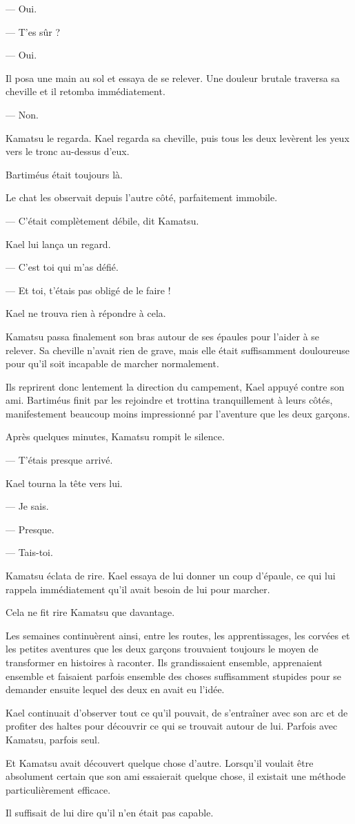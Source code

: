 — Oui.

— T'es sûr ?

— Oui.

Il posa une main au sol et essaya de se relever. Une douleur brutale traversa
sa cheville et il retomba immédiatement.

— Non.

Kamatsu le regarda. Kael regarda sa cheville, puis tous les deux levèrent les
yeux vers le tronc au-dessus d'eux.

Bartiméus était toujours là.

Le chat les observait depuis l'autre côté, parfaitement immobile.

— C'était complètement débile, dit Kamatsu.

Kael lui lança un regard.

— C'est toi qui m'as défié.

— Et toi, t'étais pas obligé de le faire !

Kael ne trouva rien à répondre à cela.

Kamatsu passa finalement son bras autour de ses épaules pour l'aider à se
relever. Sa cheville n'avait rien de grave, mais elle était suffisamment
douloureuse pour qu'il soit incapable de marcher normalement.

Ils reprirent donc lentement la direction du campement, Kael appuyé contre son
ami. Bartiméus finit par les rejoindre et trottina tranquillement à leurs
côtés, manifestement beaucoup moins impressionné par l'aventure que les deux
garçons.

Après quelques minutes, Kamatsu rompit le silence.

— T'étais presque arrivé.

Kael tourna la tête vers lui.

— Je sais.

— Presque.

— Tais-toi.

Kamatsu éclata de rire. Kael essaya de lui donner un coup d'épaule, ce qui lui
rappela immédiatement qu'il avait besoin de lui pour marcher.

Cela ne fit rire Kamatsu que davantage.

\scenebreak

Les semaines continuèrent ainsi, entre les routes, les apprentissages, les
corvées et les petites aventures que les deux garçons trouvaient toujours le
moyen de transformer en histoires à raconter. Ils grandissaient ensemble,
apprenaient ensemble et faisaient parfois ensemble des choses suffisamment
stupides pour se demander ensuite lequel des deux en avait eu l'idée.

Kael continuait d'observer tout ce qu'il pouvait, de s'entraîner avec son arc
et de profiter des haltes pour découvrir ce qui se trouvait autour de lui.
Parfois avec Kamatsu, parfois seul.

Et Kamatsu avait découvert quelque chose d'autre. Lorsqu'il voulait être
absolument certain que son ami essaierait quelque chose, il existait une
méthode particulièrement efficace.

Il suffisait de lui dire qu'il n'en était pas capable.